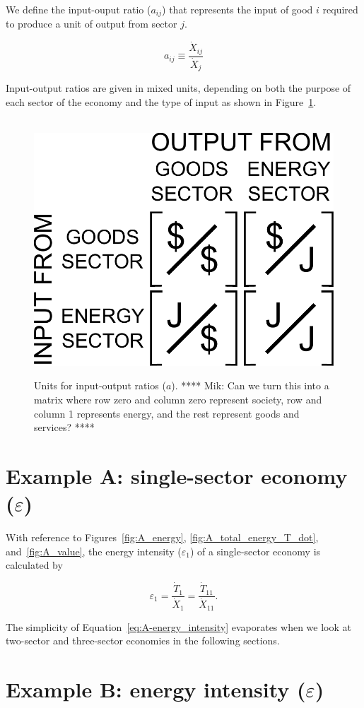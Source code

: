 We define the input-ouput ratio ($a_{ij}$) that represents the input 
of good $i$ required to produce a unit of output from sector $j$.

\begin{equation} \label{eq:aij_def}
	a_{ij} \equiv \frac{\dot{X}_{ij}}{\dot{X}_{j}}
\end{equation}

Input-output ratios are given in mixed units, 
depending on both the purpose of each sector of the economy 
and the type of input as shown in Figure~\ref{fig:A_matrix_units}.

\begin{figure}[h!]
\centering\
\includegraphics[width=0.4\linewidth]{Part_3/Chapter_Intensity/images/I-O_units.pdf}
\caption{Units for input-output ratios ($a$). **** Mik: Can we turn this
into a matrix where row zero and column zero represent society, 
row and column 1 represents energy, and the rest represent goods and services? ****}
\label{fig:A_matrix_units}
\end{figure}


\section{Example A: single-sector economy ($\varepsilon$)} %

With reference to Figures~\ref{fig:A_energy}, 
\ref{fig:A_total_energy_T_dot}, 
and~\ref{fig:A_value},
the energy intensity ($\varepsilon_{1}$) of a single-sector economy is calculated by

\begin{equation} \label{eq:A-energy_intensity}
	\varepsilon_{1} 
	= \frac{\dot{T}_{1}}{\dot{X}_{1}} 
	= \frac{\dot{T}_{11}}{\dot{X}_{11}}.
\end{equation}

The simplicity of Equation~\ref{eq:A-energy_intensity}
evaporates when we look at two-sector and three-sector economies
in the following sections.


\section{Example B: energy intensity ($\varepsilon$)} %

